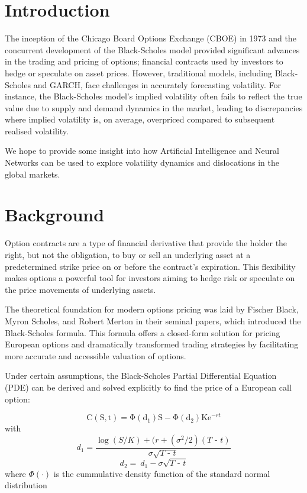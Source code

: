 \documentclass[10pt]{article}
\begin{document}
\section{Introduction}

The inception of the Chicago Board Options Exchange (CBOE) in 1973\cite{cboe2024} and the concurrent development of the Black-Scholes model provided significant advances in the trading and pricing of options; financial contracts used by investors to hedge or speculate on asset prices. However, traditional models, including Black-Scholes and GARCH, face challenges in accurately forecasting volatility. For instance, the Black-Scholes model's implied volatility often fails to reflect the true value due to supply and demand dynamics in the market, leading to discrepancies where implied volatility is, on average, overpriced compared to subsequent realised volatility.

We hope to provide some insight into how Artificial Intelligence and Neural Networks can be used to explore volatility dynamics and dislocations in the global markets.


\section{Background}
Option contracts are a type of financial derivative that provide the holder the right, but not the obligation, to buy or sell an underlying asset at a predetermined strike price on or before the contract's expiration. This flexibility makes options a powerful tool for investors aiming to hedge risk or speculate on the price movements of underlying assets.

The theoretical foundation for modern options pricing was laid by Fischer Black, Myron Scholes, and Robert Merton in their seminal papers, which introduced the Black-Scholes formula\cite{black1973pricing}. This formula offers a closed-form solution for pricing European options and dramatically transformed trading strategies by facilitating more accurate and accessible valuation of options. 

Under certain assumptions, the Black-Scholes Partial Differential Equation (PDE) can be derived and solved explicitly to find the price of a European call option:

\begin{equation}
	\mathrm C(\mathrm S,\mathrm t)= \mathrm \Phi(\mathrm d_1)\mathrm S - \mathrm \Phi(\mathrm d_2) \mathrm K \mathrm e^{-rt}
	\label{eq:2}
\end{equation}
with 
\begin{equation}
    d_1 = \frac{\log{(S/K)} + (r + (\sigma^2/2)(\textit{T - t})}{\sigma\sqrt{\textit{T - t}}}
\end{equation}
\begin{equation}
    d_2 = \ d_1 - \sigma \sqrt{\textit{T - t}}
\end{equation}
where \(\Phi(\cdot)\) is the cummulative density function of the standard normal distribution 
\end{document}
